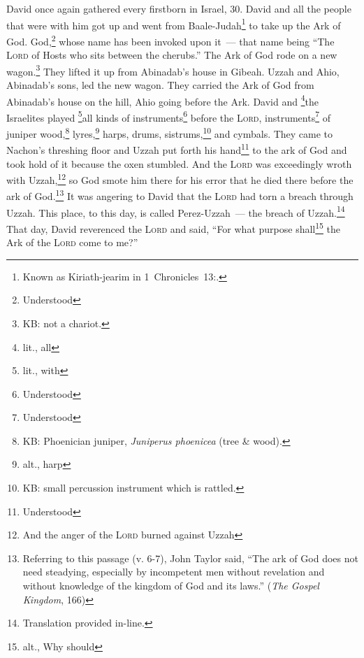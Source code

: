
\begin{inparaenum}
     David once again gathered every firstborn in Israel, 30.%
     David and all the people that were with him got up and went from Baale-Judah\footnote{Known as Kiriath-jearim in 1~Chronicles~13\thinspace:.} to take up the Ark of God. God,\footnote{Understood} whose name has been invoked upon it~--- that name being ``The \textsc{Lord} of Hosts who sits between the cherubs.''%
     The Ark of God rode on a new wagon.\footnote{KB: not a chariot.} They lifted it up from Abinadab's house in Gibeah. Uzzah and Ahio, Abinadab's sons, led the new wagon.%
     They carried the Ark of God from Abinadab's house on the hill, Ahio going before the Ark.%
     David and \footnote{lit., all}the Israelites played \footnote{lit., with}all kinds of instruments\footnote{Understood} before the \textsc{Lord}, instruments\footnote{Understood} of juniper wood,\footnote{KB: Phoenician juniper, \textit{Juniperus phoenicea} (tree \& wood).} lyres,\footnote{alt., harp} harps, drums, sistrums,\footnote{KB: small percussion instrument which is rattled.} and cymbals.%
     They came to Nachon's threshing floor and Uzzah put forth his hand\footnote{Understood} to the ark of God and took hold of it because the oxen stumbled.%
     And the \textsc{Lord} was exceedingly wroth with Uzzah,\footnote{And the anger of the \textsc{Lord} burned against Uzzah} so God smote him there for his error that he died there before the ark of God.\footnote{Referring to this passage (v. 6-7), John Taylor said, ``The ark of God does not need steadying, especially by incompetent men without revelation and without knowledge of the kingdom of God and its laws.'' (\textit{The Gospel Kingdom}, 166)}%
     It was angering to David that the \textsc{Lord} had torn a breach through Uzzah. This place, to this day, is called Perez-Uzzah~--- the breach of Uzzah.\footnote{Translation provided in-line.}%
     That day, David reverenced the \textsc{Lord} and said, ``For what purpose shall\footnote{alt., Why should} the Ark of the \textsc{Lord} come to me?''%

\end{inparaenum}
